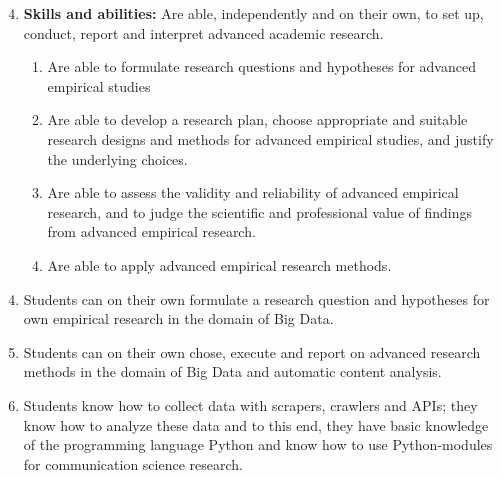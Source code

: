 \documentclass[a4paper,12pt]{report}
\begin{document}
{\footnotesize{
	\begin{enumerate}
		\setcounter{enumi}{3}
	\item{\textbf{Skills and abilities:} Are able, independently and on their own, to set up, conduct, report and interpret advanced academic research.}
	\begin{enumerate}
		\item{Are able to formulate research questions and hypotheses for advanced empirical studies}
		\item{Are able to develop a research plan, choose appropriate and suitable research designs and methods for advanced empirical studies, and justify the underlying choices.}
		\item{Are able to assess the validity and reliability of advanced empirical research, and to judge the scientific and professional value of findings from advanced empirical research.}
		\item{Are able to apply advanced empirical research methods.} 
	\end{enumerate}
\end{enumerate}
 }}

\begin{enumerate}[A]
\setcounter{enumi}{3}
\item Students can on their own formulate a research question and hypotheses for own empirical research in the domain of Big Data.
\item Students can on their own chose, execute and report on advanced research methods in the domain of Big Data and automatic content analysis.
\item Students know how to collect data with scrapers, crawlers and APIs; they know how to analyze these data and to this end, they have basic knowledge of the programming language Python and know how to use Python-modules for communication science research.
\end{enumerate}
\end{document}
